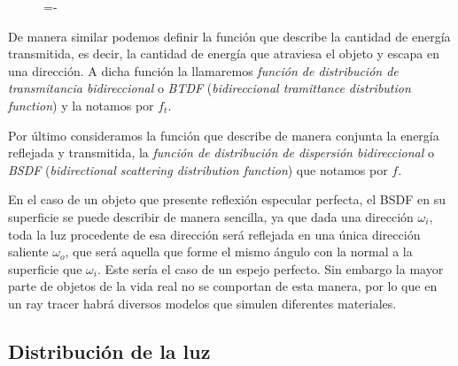 \begin{figure}[h]
  \lineskip=-\fboxrule
\end{figure}

De manera similar podemos definir la función que describe la cantidad de energía transmitida, es decir, la cantidad de energía que atraviesa el objeto y escapa en una dirección. A dicha función la llamaremos \emph{función de distribución de transmitancia bidireccional} o \emph{BTDF} (\emph{bidireccional tramittance distribution function}) y la notamos por $f_t$.

Por último consideramos la función que describe de manera conjunta la energía reflejada y transmitida, la \emph{función de distribución de dispersión bidireccional} o \emph{BSDF} (\emph{bidirectional scattering distribution function}) que notamos por $f$.

En el caso de un objeto que presente reflexión especular perfecta, el BSDF en su superficie se puede describir de manera sencilla, ya que dada una dirección $\omega _i$, toda la luz procedente de esa dirección será reflejada en una única dirección saliente $\omega _o$, que será aquella que forme el mismo ángulo con la normal a la superficie que $\omega _i$. Este sería el caso de un espejo perfecto. Sin embargo la mayor parte de objetos de la vida real no se comportan de esta manera, por lo que en un ray tracer habrá diversos modelos que simulen diferentes materiales.

\subsection{Distribución de la luz}

